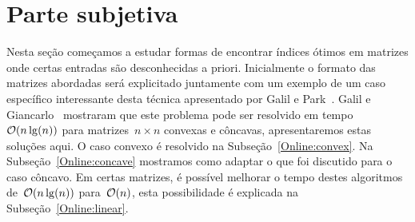 \chapter{Parte subjetiva}
\label{Subjetiva}

Nesta seção começamos a estudar formas de encontrar índices ótimos em matrizes onde certas entradas são desconhecidas a priori. Inicialmente o formato das matrizes abordadas será explicitado juntamente com um exemplo de um caso específico interessante desta técnica apresentado por Galil e Park~\cite{Galil:1992}. Galil e Giancarlo~\cite{Galil:1989} mostraram que este problema pode ser resolvido em tempo~$\mathcal{O}(n\lg(n))$ para matrizes~$n \times n$ convexas e côncavas, apresentaremos estas soluções aqui. O caso convexo é resolvido na Subseção~\ref{Online:convex}. Na Subseção~\ref{Online:concave} mostramos como adaptar o que foi discutido para o caso côncavo. Em certas matrizes, é possível melhorar o tempo destes algoritmos de~$\mathcal{O}(n\lg(n))$ para~$\mathcal{O}(n)$, esta possibilidade é explicada na Subseção~\ref{Online:linear}.


